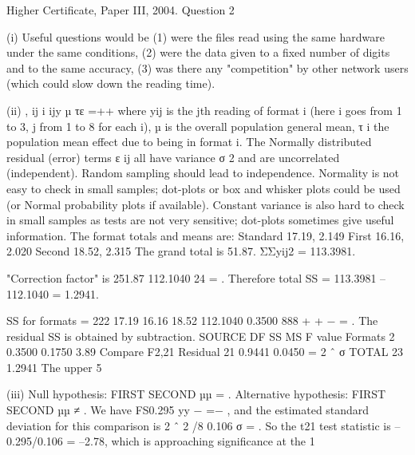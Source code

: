 \documentclass[a4paper,12pt]{article}
\begin{document}
Higher Certificate, Paper III, 2004.  Question 2 
 
(i) Useful questions would be (1) were the files read using the same hardware under the same conditions, (2) were the data given to a fixed number of digits and to the same accuracy, (3) was there any "competition" by other network users (which could slow down the reading time). 
 
(ii) , ij i ijy µ τε =++ where yij is the jth reading of format i (here i goes from 1 to 3, j from 1 to 8 for each i), µ is the overall population general mean, τ i the population mean effect due to being in format i.  The Normally distributed residual (error) terms ε ij all have variance σ 2 and are uncorrelated (independent).  Random sampling should lead to independence.  Normality is not easy to check in small samples;  dot-plots or box and whisker plots could be used (or Normal probability plots if available).  Constant variance is also hard to check in small samples as tests are not very sensitive;  dot-plots sometimes give useful information. 
 The format totals and means are: Standard 17.19, 2.149  First 16.16, 2.020  Second 18.52, 2.315 
 The grand total is 51.87.    ΣΣyij2 = 113.3981. 
 
"Correction factor" is 
251.87 112.1040 24 = . 
 Therefore total SS = 113.3981 – 112.1040 = 1.2941. 
 
SS for formats = 
222 17.19 16.16 18.52 112.1040 0.3500 888 + + − = . 
 The residual SS is obtained by subtraction. 
 SOURCE DF SS MS F value Formats   2 0.3500 0.1750      3.89   Compare F2,21 Residual 21 0.9441 0.0450 = 2 ˆ σ
 TOTAL 23 1.2941   
 The upper 5%
 
(iii) Null hypothesis:  FIRST SECOND µµ = .  Alternative hypothesis:  FIRST SECOND µµ ≠ . 
 We have FS0.295 yy − =− , and the estimated standard deviation for this comparison is 2 ˆ 2 /8 0.106 σ = .  So the t21 test statistic is –0.295/0.106 = –2.78, which is approaching significance at the 1%
\end{document}
